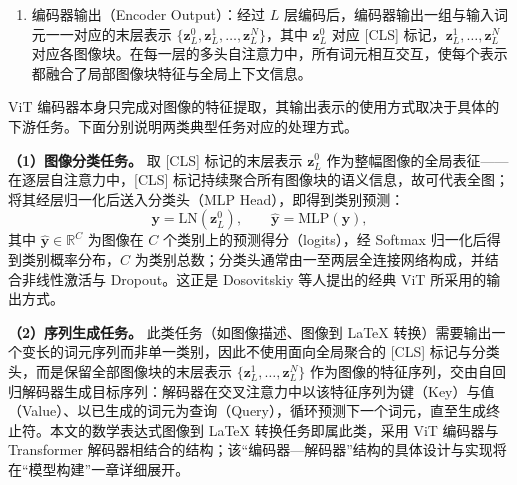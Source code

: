 \begin{enumerate}[label={（\arabic*）}, leftmargin=2em, labelsep=0.5em, itemsep=0pt]
    多头自注意力（MSA）和多层感知机（MLP）在 Transformer 编码器中的每层计算过程如式\ref{eq:transformer-encoder-msa}和式\ref{eq:transformer-encoder-mlp}所示（含层归一化和残差连接）：
    \begin{align}
        \boldsymbol{z}'_l &= \text{MSA}(\text{LN}(\boldsymbol{z}_{l-1})) + \boldsymbol{z}_{l-1}, \qquad l = 1, 2, \dots, L \label{eq:transformer-encoder-msa} \\
        \boldsymbol{z}_l &= \text{MLP}(\text{LN}(\boldsymbol{z}'_l)) + \boldsymbol{z}'_l, \qquad l = 1, 2, \dots, L \label{eq:transformer-encoder-mlp}
    \end{align}
    其中 MLP 模块包含两个线性层与一个 GELU 激活函数，后者的形式为：
    \begin{equation}
        \text{GELU}(x) = x \cdot \Phi(x) = x \cdot \frac{1}{2} \left[1 + \text{erf}\left(\frac{x}{\sqrt{2}}\right)\right],
        \label{eq:GELU}
    \end{equation}
    其中 $\Phi(\cdot)$ 为标准正态分布 $\mathcal{N}(0,1)$ 的累积分布函数（CDF），$\operatorname{erf}(\cdot)$ 为误差函数。
    \item 编码器输出（Encoder Output）：经过 $L$ 层编码后，编码器输出一组与输入词元一一对应的末层表示 $\{\boldsymbol{z}^{0}_L, \boldsymbol{z}^{1}_L, \dots, \boldsymbol{z}^{N}_L\}$，其中 $\boldsymbol{z}^{0}_L$ 对应 [CLS] 标记，$\boldsymbol{z}^{1}_L, \dots, \boldsymbol{z}^{N}_L$ 对应各图像块。在每一层的多头自注意力中，所有词元相互交互，使每个表示都融合了局部图像块特征与全局上下文信息。
\end{enumerate}

ViT 编码器本身只完成对图像的特征提取，其输出表示的使用方式取决于具体的下游任务。下面分别说明两类典型任务对应的处理方式。

\textbf{（1）图像分类任务。} 取 [CLS] 标记的末层表示 $\boldsymbol{z}^{0}_L$ 作为整幅图像的全局表征——在逐层自注意力中，[CLS] 标记持续聚合所有图像块的语义信息，故可代表全图；将其经层归一化后送入分类头（MLP Head），即得到类别预测：
\begin{equation}
\boldsymbol{y} = \text{LN}(\boldsymbol{z}^{0}_L), \qquad
\hat{\boldsymbol{y}} = \text{MLP}(\boldsymbol{y}),
\end{equation}
其中 $\hat{\boldsymbol{y}} \in \mathbb{R}^{C}$ 为图像在 $C$ 个类别上的预测得分（logits），经 Softmax 归一化后得到类别概率分布，$C$ 为类别总数；分类头通常由一至两层全连接网络构成，并结合非线性激活与 Dropout。这正是 Dosovitskiy 等人提出的经典 ViT 所采用的输出方式。

\textbf{（2）序列生成任务。} 此类任务（如图像描述、图像到 LaTeX 转换）需要输出一个变长的词元序列而非单一类别，因此不使用面向全局聚合的 [CLS] 标记与分类头，而是保留全部图像块的末层表示 $\{\boldsymbol{z}^{1}_L, \dots, \boldsymbol{z}^{N}_L\}$ 作为图像的特征序列，交由自回归解码器生成目标序列：解码器在交叉注意力中以该特征序列为键（Key）与值（Value）、以已生成的词元为查询（Query），循环预测下一个词元，直至生成终止符。本文的数学表达式图像到 LaTeX 转换任务即属此类，采用 ViT 编码器与 Transformer 解码器相结合的结构；该“编码器—解码器”结构的具体设计与实现将在“模型构建”一章详细展开。
